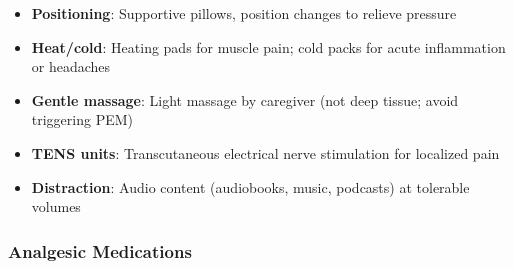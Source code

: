 \begin{itemize}
    \item \textbf{Positioning}: Supportive pillows, position changes to relieve pressure
    \item \textbf{Heat/cold}: Heating pads for muscle pain; cold packs for acute inflammation or headaches
    \item \textbf{Gentle massage}: Light massage by caregiver (not deep tissue; avoid triggering PEM)
    \item \textbf{TENS units}: Transcutaneous electrical nerve stimulation for localized pain
    \item \textbf{Distraction}: Audio content (audiobooks, music, podcasts) at tolerable volumes
\end{itemize}

\subsubsection{Analgesic Medications}

